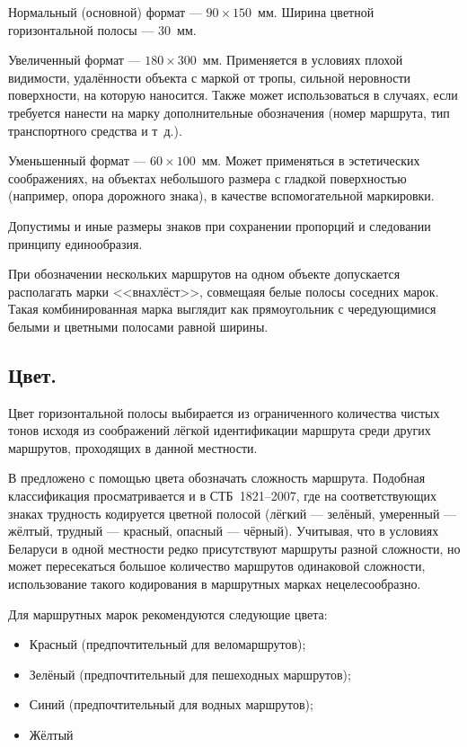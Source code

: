 \documentclass[a4paper,12pt]{extarticle}
\begin{document}
Нормальный (основной) формат --- $90\times150$~мм. Ширина цветной горизонтальной полосы --- 30~мм.

Увеличенный формат --- $180\times300$~мм. Применяется в условиях плохой видимости, удалённости объекта с маркой от
тропы, сильной неровности поверхности, на которую наносится. Также может использоваться в случаях, если требуется
нанести на марку дополнительные обозначения (номер маршрута, тип транспортного средства и т~д.).

Уменьшенный формат --- $60\times100$~мм. Может применяться в эстетических соображениях, на объектах небольшого размера с
гладкой поверхностью (например, опора дорожного знака), в качестве вспомогательной маркировки.

Допустимы и иные размеры знаков при сохранении пропорций и следовании принципу единообразия.

При обозначении нескольких маршрутов на одном объекте допускается располагать марки <<внахлёст>>, совмещаяя белые полосы
соседних марок. Такая комбинированная марка выглядит как прямоугольник с чередующимися белыми и цветными полосами равной
ширины.

\subsection{Цвет.}
Цвет горизонтальной полосы выбирается из ограниченного количества чистых тонов исходя из соображений лёгкой
идентификации маршрута среди других маршрутов, проходящих в данной местности.

В \cite{metodussr} предложено с помощью цвета обозначать сложность маршрута. Подобная классификация просматривается и в
СТБ~1821--2007, где на соответствующих знаках трудность кодируется цветной полосой  (лёгкий --- зелёный, умеренный ---
жёлтый, трудный --- красный, опасный --- чёрный). Учитывая, что в условиях Беларуси в одной местности редко присутствуют
маршруты разной сложности, но может пересекаться большое количество маршрутов одинаковой сложности, использование такого
кодирования в маршрутных марках нецелесообразно.

Для маршрутных марок рекомендуются следующие цвета:
\begin{itemize}
	\item Красный (предпочтительный для веломаршрутов);
	\item Зелёный (предпочтительный для пешеходных маршрутов);
	\item Синий (предпочтительный для водных маршрутов);
	\item Жёлтый
\end{itemize}
\end{document}
